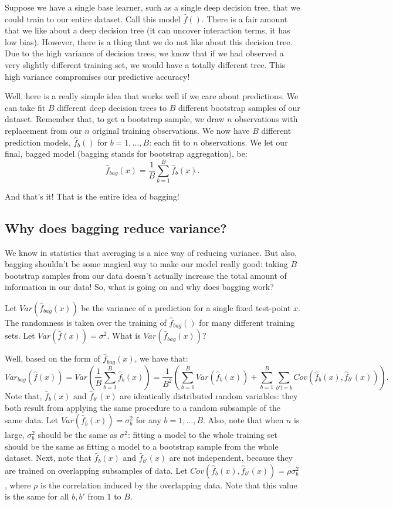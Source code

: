 Suppose we have a single base learner, such as a single deep decision tree, that we could train to our entire dataset. Call this model $\hat{f}()$. There is a fair amount that we like about a deep decision tree (it can uncover interaction terms, it has low bias). However, there is a thing that we do not like about this decision tree. Due to the high variance of decision trees, we know that if we had observed a very slightly different training set, we would have a totally different tree. This high variance compromises our predictive accuracy! 

Well, here is a really simple idea that works well if we care about predictions. We can take fit $B$ different deep decision trees to $B$ different bootstrap samples of our dataset. Remember that, to get a bootstrap sample, we draw $n$ observations with replacement from our $n$ original training observations. We now have $B$ different prediction models, $\hat{f}_b()$ for $b=1,\ldots,B$: each fit to $n$ observations. We let our final, bagged model (bagging stands for bootstrap aggregation), be:
$$
\hat{f}_{bag}(x) = \frac{1}{B} \sum_{b=1}^B \hat{f}_b(x). 
$$

And that's it! That is the entire idea of bagging!

\subsection{Why does bagging reduce variance?}

We know in statistics that averaging is a nice way of reducing variance. But also, bagging shouldn't be some magical way to make our model really good: taking $B$ bootstrap samples from our data doesn't actually increase the total amount of information in our data! So, what is going on and why does bagging work? 

Let $Var(\hat{f}_{bag}(x))$ be the variance of a prediction for a single fixed test-point $x$. The randomness is taken over the training of $\hat{f}_{bag}()$ for many different training sets. Let $Var(\hat{f}(x)) = \sigma^2$. What is $Var(\hat{f}_{bag}(x))$? 

Well, based on the form of $\hat{f}_{bag}(x)$, we have that:
$$
Var_{bag}\left(\hat{f}(x)\right) = Var\left(\frac{1}{B} \sum_{b=1}^B \hat{f}_b(x) 
\right) = \frac{1}{B^2} \left( \sum_{b=1}^B Var(\hat{f}_b(x)) + \sum_{b=1}^B \sum_{b' != b} Cov(\hat{f}_b(x),\hat{f}_{b'}(x))\right).
$$
Note that, $\hat{f}_b(x)$ and  $\hat{f}_{b'}(x)$ are identically distributed random variables: they both result from applying the same procedure to a random subsample of the same data. Let $Var(\hat{f}_b(x)) = \sigma_b^2$ for any $b=1,\ldots,B$. Also, note that when $n$ is large, $\sigma_b^2$ should be the same as $\sigma^2$: fitting a model to the whole training set should be the same as fitting a model to a bootstrap sample from the whole dataset. Next, note that  $\hat{f}_b(x)$ and  $\hat{f}_{b'}(x)$ are not independent, because they are trained on overlapping subsamples of data. Let $Cov(\hat{f}_b(x),\hat{f}_{b'}(x)) = \rho \sigma_b^2$, where $\rho$ is the correlation induced by the overlapping data. Note that this value is the same for all $b,b'$ from $1$ to $B$. 

